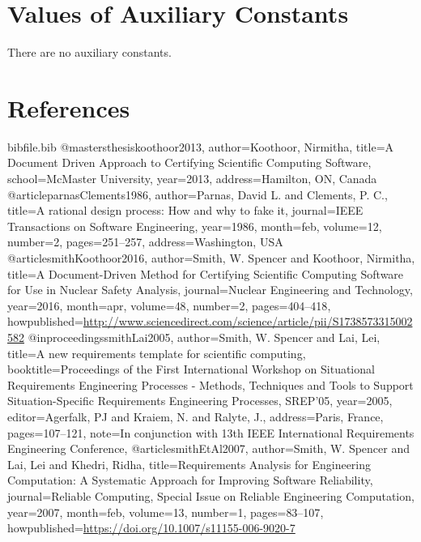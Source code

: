 \documentclass[12pt]{article}
\begin{document}
\section{Values of Auxiliary Constants}
\label{Sec:AuxConstants}
There are no auxiliary constants.

\section{References}
\label{Sec:References}
\begin{filecontents*}{bibfile.bib}
@mastersthesis{koothoor2013,
author={Koothoor, Nirmitha},
title={A Document Driven Approach to Certifying Scientific Computing Software},
school={McMaster University},
year={2013},
address={Hamilton, ON, Canada}}
@article{parnasClements1986,
author={Parnas, David L. and Clements, P. C.},
title={A rational design process: How and why to fake it},
journal={IEEE Transactions on Software Engineering},
year={1986},
month=feb,
volume={12},
number={2},
pages={251--257},
address={Washington, USA}}
@article{smithKoothoor2016,
author={Smith, W. Spencer and Koothoor, Nirmitha},
title={A Document-Driven Method for Certifying Scientific Computing Software for Use in Nuclear Safety Analysis},
journal={Nuclear Engineering and Technology},
year={2016},
month=apr,
volume={48},
number={2},
pages={404--418},
howpublished={\url{http://www.sciencedirect.com/science/article/pii/S1738573315002582}}}
@inproceedings{smithLai2005,
author={Smith, W. Spencer and Lai, Lei},
title={A new requirements template for scientific computing},
booktitle={Proceedings of the First International Workshop on Situational Requirements Engineering Processes - Methods, Techniques and Tools to Support Situation-Specific Requirements Engineering Processes, SREP'05},
year={2005},
editor={Agerfalk, PJ and Kraiem, N. and Ralyte, J.},
address={Paris, France},
pages={107--121},
note={In conjunction with 13th IEEE International Requirements Engineering Conference,}}
@article{smithEtAl2007,
author={Smith, W. Spencer and Lai, Lei and Khedri, Ridha},
title={Requirements Analysis for Engineering Computation: A Systematic Approach for Improving Software Reliability},
journal={Reliable Computing, Special Issue on Reliable Engineering Computation},
year={2007},
month=feb,
volume={13},
number={1},
pages={83--107},
howpublished={\url{https://doi.org/10.1007/s11155-006-9020-7}}}
\end{filecontents*}
\nocite{*}
\printbibliography[heading=none]
\end{document}
